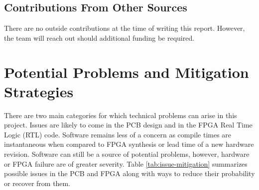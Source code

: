 \documentclass[letterpaper,12pt]{article}
\begin{document}
\subsection{Contributions From Other Sources}
There are no outside contributions at the time of writing this report. However,
the team will reach out should additional funding be required. 

\section{Potential Problems and Mitigation Strategies}
There are two main categories for which technical problems can arise in this
project. Issues are likely to come in the PCB design and in the FPGA Real Time
Logic (RTL) code. Software remains less of a concern as compile times are
instantaneous when compared to FPGA synthesis or lead time of a new hardware
revision. Software can still be a source of potential problems, however,
hardware or FPGA failure are of greater severity. Table \ref{tab:issue-mitigation}
summarizes possible issues in the PCB and FPGA along with ways to reduce their
probability or recover from them.
\end{document}
